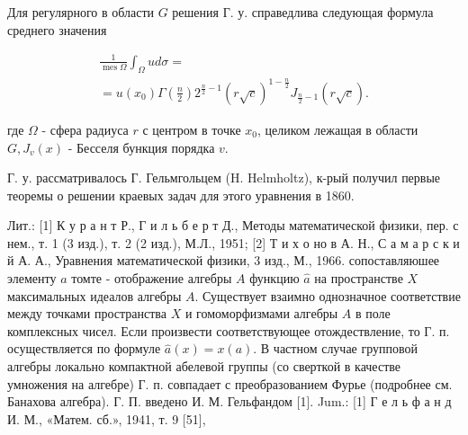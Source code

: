 \documentclass[10pt]{article}
\begin{document}
Для регулярного в области $G$ решения Г. у. справедлива следующая формула среднего значения



\[

\begin{gathered}

\frac{1}{\operatorname{mes} \Omega} \int_{\Omega} u d \sigma= \\

=u\left(x_{0}\right) \Gamma\left(\frac{n}{2}\right) 2^{\frac{n}{2}-1}(r \sqrt{c})^{1-\frac{n}{2}} J_{\frac{n}{2}-1}(r \sqrt{c}) .

\end{gathered}

\]



где $\Omega$ - сфера радиуса $r$ с центром в точке $x_{0}$, целиком лежащая в области $G, J_{v}(x)$ - Бесселя бункция порядка $v$.



Г. у. рассматривалось Г. Гельмгольцем (H. Helmholtz), к-рый получил первые теоремы о решении краевых задач для этого уравнения в 1860.



Лит.: [1] К у р а н т Р., Г и л ь б е р т Д., Методы математической физики, пер. с нем., т. 1 (3 изд.), т. 2 (2 изд.), М.Л., 1951; [2] Т и х о но в А. Н., С а м а р с к и й А. А., Уравнения математической физики, 3 изд., М., 1966. сопоставляюшее элементу $a$ томте - отображение алгебры $A$ функцию $\hat{a}$ на пространстве $X$ максимальных идеалов алгебры $A$. Существует взаимно однозначное соответствие между точками пространства $X$ и гомоморфизмами алгебры $A$ в поле комплексных чисел. Если произвести соответствующее отождествление, то Г. п. осуществляется по формуле $\hat{a}(x)=x(a)$. В частном случае групповой алгебры локально компактной абелевой группы (со сверткой в качестве умножения на алгебре) Г. п. совпадает с преобразованием Фурье (подробнее см. Банахова алгебра). Г. П. введено И. М. Гельфандом [1]. Jum.: [1] Г е л ь ф а н д И. М., «Матем. сб.», 1941, т. 9 [51],
\end{document}
